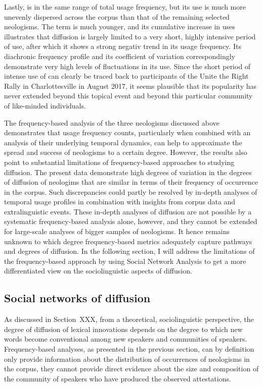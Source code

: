 \documentclass[
  a4paper,
  abstract=on,
  captions=tableabove
  ]{scrartcl}
\begin{document}
        Lastly,  is in the same range of total usage frequency, but its use is much more unevenly dispersed across the corpus than that of the remaining selected neologisms. The term is much younger, and its cumulative increase in uses illustrates that diffusion is largely limited to a very short, highly intensive period of use, after which it shows a strong negativ trend in its usage frequency. Its diachronic frequency profile and its coefficient of variation correspondingly demonstrate very high levels of fluctuations in its use. Since the short period of intense use of  can clearly be traced back to participants of the Unite the Right Rally in Charlottesville in August 2017, it seems plausible that its popularity has never extended beyond this topical event and beyond this particular community of like-minded individuals.
        
        The frequency-based analysis of the three neologisms discussed above demonstrates that usage frequency counts, particularly when combined with an analysis of their underlying temporal dynamics, can help to approximate the spread and success of neologisms to a certain degree. However, the results also point to substantial limitations of frequency-based approaches to studying diffusion. The present data demonstrate high degrees of variation in the degrees of diffusion of neologims that are similar in terms of their frequency of occurrence in the corpus. Such discrepancies could partly be resolved by in-depth analyses of temporal usage profiles in combination with insights from corpus data and extralinguistic events. These in-depth analyses of diffusion are not possible by a systematic frequency-based analysis alone, however, and they cannot be extended for large-scale analyses of bigger samples of neologisms. It hence remains unknown to which degree frequency-based metrics adequately capture pathways and degrees of diffusion. In the following section, I will address the limitations of the frequency-based approach by using Social Network Analysis to get a more differentiated view on the sociolinguistic aspects of diffusion.


  \subsection{Social networks of diffusion}
    \label{subsec:sna}

    As discussed in Section~XXX, from a theoretical, sociolinguistic perspective, the degree of diffusion of lexical innovations depends on the degree to which new words become conventional among new speakers and communities of speakers. Frequency-based analyses, as presented in the previous section, can by definition only provide information about the distribution of occurrences of neologisms in the corpus, they cannot provide direct evidence about the size and composition of the community of speakers who have produced the observed attestations.
\end{document}
